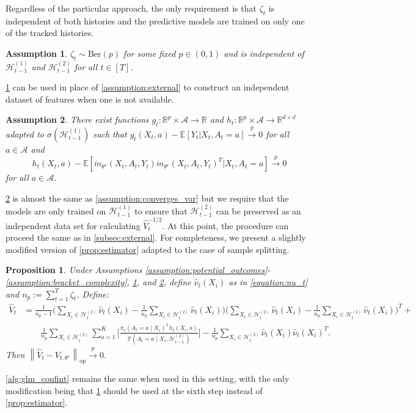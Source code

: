 \documentclass[11pt]{article}
\newcommand{\E}{\mathbb{E}}
\newcommand{\norm}[1]{\left\lVert#1\right\rVert}
\newtheorem{proposition}{Proposition}
\newtheorem{assumption}{Assumption}
\begin{document}
Regardless of the particular approach, the only requirement is that $\zeta_{t}$ is independent of both histories and the predictive models are trained on only one of the tracked histories.  
\begin{assumption} \label{assumption:independence_zeta}
    $\zeta_{t} \sim \text{Ber}(p)$ for some fixed $p \in (0,1)$ and is independent of $\mathcal{H}_{t-1}^{(1)}$ and $\mathcal{H}_{t-1}^{(2)}$ for all $t\in [T]$.
\end{assumption}
\cref{assumption:independence_zeta} can be used in place of \cref{assumption:external} to construct an independent dataset of features when one is not available. 
\begin{assumption}
 \label{assumption:converges_var_sequential} There exist functions $g_{t} : \mathbb{R}^{p} \times \mathcal{A} \to \mathbb{R}$ and $h_{t} : \mathbb{R}^{p}\times \mathcal{A}  \to \mathbb{R}^{d \times d}$ adapted to $\sigma(\mathcal{H}_{t-1}^{(1)})$ such that 
$g_{t}(X_{t},a) - \E[Y_{t} | X_{t}, A_{t} = a] \overset{p}{\to} 0$ for all $a \in \mathcal{A}$ and $$h_{t}(X_{t},a) - \E \left[  \dot{m}_{\theta^{\star}}(X_t,A_t,Y_{t} )\dot{m}_{\theta^{\star}}(X_t,A_t,Y_{t} )^{T} | X_{t},A_t=a \right] \overset{p}{\to} 0$$ for all $a \in \mathcal{A}$. 
\end{assumption}
\cref{assumption:converges_var_sequential} is almost the same as \cref{assumption:converges_var} but we require that the models are only trained on $\mathcal{H}_{t-1}^{(1)}$ to ensure that $\mathcal{H}_{t-1}^{(2)}$ can be preserved as an independent data set for calculating $\hat{V}_{t}^{-1/2}$. At this point, the procedure can proceed the same as in \cref{subsec:external}. For completeness, we present a slightly modified version of \cref{prop:estimator} adapted to the case of sample splitting.

\begin{proposition} \label{prop:estimator_sequential}
Under Assumptions \ref{assumption:potential_outcomes}- \ref{assumption:bracket_complexity}, \ref{assumption:independence_zeta}, and \ref{assumption:converges_var_sequential}, define $\hat{\nu}_t(X_i)$ as in \cref{equation:nu_t} and  $n_p := \sum_{t=1}^{T} \zeta_t$. Define:
\begin{align*}
\hat{V}_{t} &= \frac{1}{n_p - 1} 
\Biggl( \sum_{X_i \in \mathcal{H}_{t}^{(2)}} \hat{\nu}_t(X_i) 
- \frac{1}{n_p} \sum_{X_i \in \mathcal{H}_{t}^{(2)}} \hat{\nu}_t(X_i) \Biggr)
\Biggl( \sum_{X_i \in \mathcal{H}_{t}^{(2)}} \hat{\nu}_t(X_i) 
- \frac{1}{n_p} \sum_{X_i \in \mathcal{H}_{t}^{(2)}} \hat{\nu}_t(X_i) \Biggr)^{T} + \\
&\qquad \frac{1}{n_p} \sum_{X_i \in \mathcal{H}_{t}^{(2)}} \sum_{a=1}^{K} 
\Biggl[ 
\frac{\pi_e(A_t = a \mid X_i)^2 \, h_t(X_i,a)}{\mathbb{P}(A_t = a \mid X_i, \mathcal{H}_{t-1}^{(2)})} 
\Biggr]-\frac{1}{n_p} \sum_{X_i \in \mathcal{H}_{t}^{(2)}}  \hat{\nu}_{t}(X_i)\hat{\nu}_{t}(X_i)^{T}.
\end{align*}
Then $\norm{\hat{V}_{t} - V_{t,\theta^{\star}}}_{\mathrm{op}} \overset{p}{\to} 0$.
\end{proposition}
\cref{alg:glm_confint} remains the same when used in this setting, with the only modification being that \cref{prop:estimator_sequential} should be used at the sixth step instead of \cref{prop:estimator}.
\end{document}
